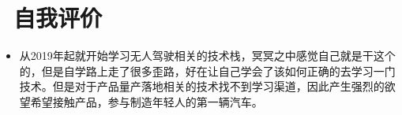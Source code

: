 \documentclass{resume}
\begin{document}
\section{\faInfo\ 自我评价}
\begin{itemize}[parsep=0.5ex]
  \item 从2019年起就开始学习无人驾驶相关的技术栈，冥冥之中感觉自己就是干这个的，但是自学路上走了很多歪路，好在让自己学会了该如何正确的去学习一门技术。但是对于产品量产落地相关的技术找不到学习渠道，因此产生强烈的欲望希望接触产品，参与制造年轻人的第一辆汽车。
\end{itemize}

%
%
\end{document}
